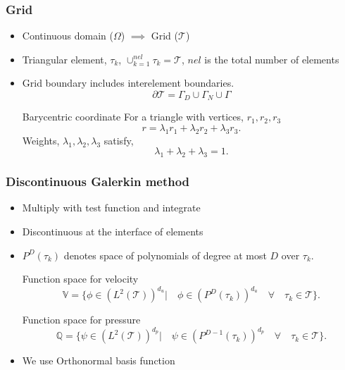 \documentclass{beamer}
\begin{document}
\begin{frame}
\frametitle{Grid}
\begin{itemize}
\item Continuous domain ($\Omega$) $\implies$ Grid ($\mathcal{T}$)
\item Triangular element, $\tau_k$, $\cup_{k=1}^{nel} \tau_k = \mathcal{T}$, $nel$ is the total number of elements
\item Grid boundary includes interelement boundaries.
\begin{equation}
\partial \mathcal{T} = \Gamma_D \cup \Gamma_N \cup \Gamma
\end{equation}

\begin{block}{Barycentric coordinate}
For a triangle with vertices, $r_1, r_2, r_3$
\begin{equation}\label{barycentric point}
r = \lambda_1 r_1 + \lambda_2 r_2 + \lambda_3 r_3 \textrm{.}
\end{equation}
Weights, $\lambda_1, \lambda_2, \lambda_3$ satisfy,
\begin{equation}\label{lambda constraint} 
\lambda_1 + \lambda_2 + \lambda_3 = 1 \textrm{.}
\end{equation}
\end{block}

\end{itemize}
\end{frame}


\begin{frame}
\frametitle{Discontinuous Galerkin method}
\begin{itemize}
\item Multiply with test function and integrate
\item Discontinuous at the interface of elements
\item $P^D(\tau_k)$ denotes space of polynomials of degree at most $D$ over $\tau_k$.

\begin{block}{Function space for velocity}
\begin{equation}
\mathbb{V} = \lbrace \phi \in (L^2(\mathcal{T}))^{d_u}| \quad \phi \in (P^D(\tau_k))^{d_u} \quad \forall \quad {\tau_k} \in \mathcal{T} \rbrace \textrm{.}
\end{equation}
\end{block}

\begin{block}{Function space for pressure}
\begin{equation}
\mathbb{Q} = \lbrace \psi \in (L^2(\mathcal{T}))^{d_p}| \quad \psi \in (P^{D-1}(\tau_k))^{d_p} \quad \forall \quad {\tau_k} \in \mathcal{T} \rbrace \textrm{.}
\end{equation}
\end{block}
\item We use Orthonormal basis function
\end{itemize}
\end{frame}
\end{document}
